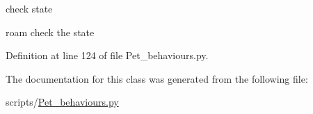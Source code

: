 check state 

roam check the state 

Definition at line 124 of file Pet\+\_\+behaviours.\+py.



The documentation for this class was generated from the following file\+:\begin{DoxyCompactItemize}
\item 
scripts/\hyperlink{Pet__behaviours_8py}{Pet\+\_\+behaviours.\+py}\end{DoxyCompactItemize}
